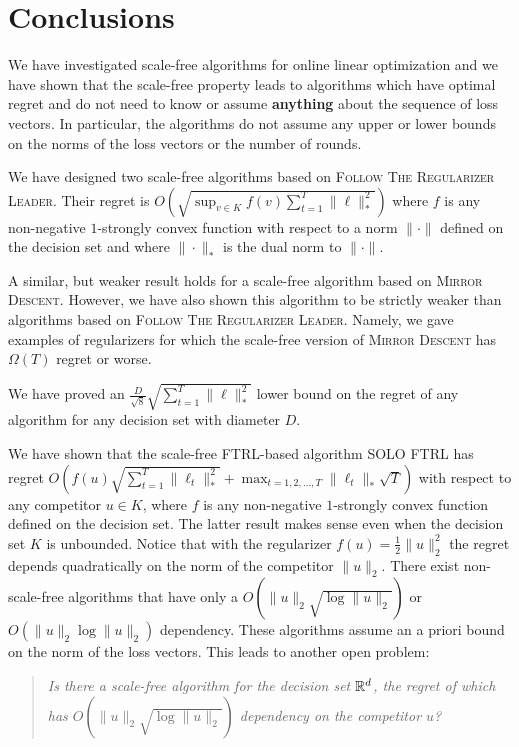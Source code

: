 \section{Conclusions}
\label{section:conclusions}

We have investigated scale-free algorithms for online linear optimization and
we have shown that the scale-free property leads to algorithms which have optimal
regret and do not need to know or assume \textbf{anything} about the sequence
of loss vectors. In particular, the algorithms do not assume any upper or lower
bounds on the norms of the loss vectors or the number of rounds.

We have designed two scale-free algorithms based on \textsc{Follow The
Regularizer Leader}.  Their regret is $O \left(\sqrt{\sup_{v \in K} f(v)
\sum_{t=1}^T \|\ell\|_*^2} \right)$ where $f$ is any non-negative $1$-strongly
convex function with respect to a norm $\|\cdot\|$ defined on the decision set
and where $\|\cdot\|_*$ is the dual norm to $\|\cdot\|$.

A similar, but weaker result holds for a scale-free algorithm based on
\textsc{Mirror Descent}. However, we have also shown this algorithm to be strictly
weaker than algorithms based on \textsc{Follow The Regularizer Leader}. Namely,
we gave examples of regularizers for which the scale-free version of
\textsc{Mirror Descent} has $\Omega(T)$ regret or worse.

We have proved an $\frac{D}{\sqrt{8}} \sqrt{\sum_{t=1}^T \|\ell\|_*^2}$
lower bound on the regret of any algorithm for any decision set with diameter $D$.

We have shown that the scale-free \textsc{FTRL}-based algorithm \textsc{SOLO FTRL} has
regret $O \left(f(u) \sqrt{\sum_{t=1}^T \|\ell_t\|_*^2} + \max_{t=1,2,\dots,T}
\|\ell_t\|_* \sqrt{T} \right)$ with respect to any competitor $u \in K$, where
$f$ is any non-negative $1$-strongly convex function defined on the decision
set.  The latter result makes sense even when the decision set $K$ is
unbounded. Notice that with the regularizer $f(u) = \frac{1}{2}\|u\|_2^2$ the
regret depends quadratically on the norm of the competitor $\|u\|_2$. There
exist non-scale-free algorithms \cite{McMahan-Streeter-2012,
McMahan-Abernethy-2013, Orabona-2013, McMahan-Orabona-2014, Orabona-2014} that
have only a $O(\|u\|_2 \sqrt{\log \|u\|_2})$ or $O(\|u\|_2 \log \|u\|_2)$
dependency.  These algorithms assume an a priori bound on the norm of the loss
vectors.  This leads to another open problem:
%
\begin{quotation}
\noindent
\emph{Is there a scale-free algorithm for the decision set $\mathbb{R}^d$, the regret of
which has $O(\|u\|_2 \sqrt{\log \|u\|_2})$ dependency on the competitor $u$?}
\end{quotation}
